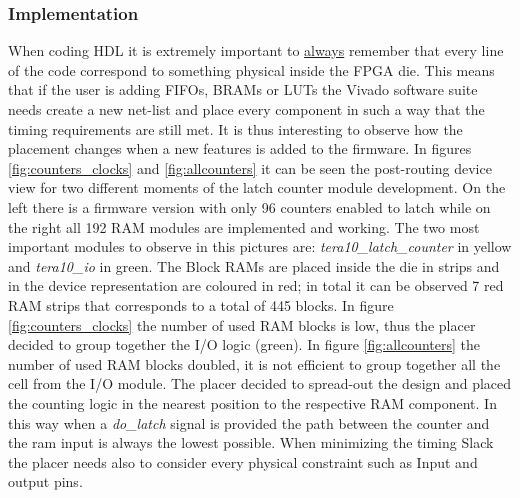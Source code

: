 \subsubsection{Implementation}
When coding HDL it is extremely important to \underline{always} remember that every line of the code correspond to something physical inside the FPGA die. This means that if the user is adding FIFOs, BRAMs or LUTs the Vivado software suite needs create a new net-list and place every component in such a way that the timing requirements are still met.
It is thus interesting to observe how the placement changes when a new features is added to the firmware.
In figures \ref{fig:counters_clocks} and \ref{fig:allcounters} it can be seen the post-routing device view for two different moments of the latch counter module development. On the left there is a firmware version with only 96 counters enabled to latch while on the right all 192 RAM modules are implemented and working.
The two most important modules to observe in this pictures are: \textit{tera10\_latch\_counter} in yellow and \textit{tera10\_io} in green.
The Block RAMs are placed inside the die in strips and in the device representation are coloured in red; in total it can be observed 7 red RAM strips that corresponds to a total of 445 blocks.
In figure \ref{fig:counters_clocks} the number of used RAM blocks is low, thus the placer decided to group together the I/O logic (green).
In figure \ref{fig:allcounters} the number of used RAM blocks doubled, it is not efficient to group together all the cell from the I/O module. The placer decided to spread-out the design and placed the counting logic in the nearest position to the respective RAM component. In this way when a \textit{do\_latch} signal is provided the path between the counter and the ram input is always the lowest possible.
When minimizing the timing Slack the placer needs also to consider every physical constraint such as Input and output pins. 
